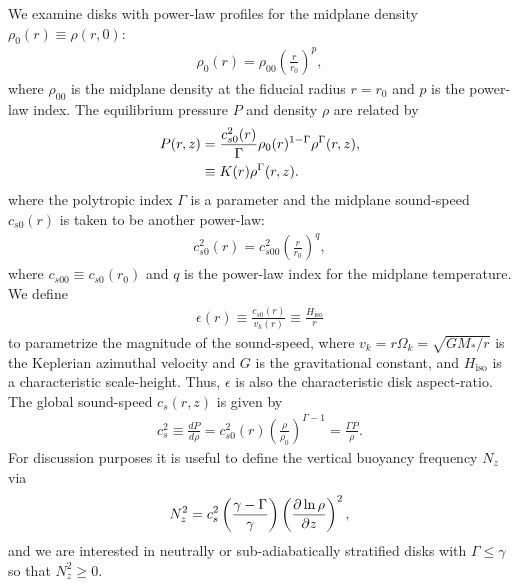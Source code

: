 We examine disks with power-law profiles for the midplane density
$\rho_0(r)\equiv\rho(r,0)$: 
\begin{align}
  \rho_0(r) = \rho_{00}\left(\frac{r}{r_0}\right)^p,
\end{align}
where $\rho_{00}$ is the midplane density at the fiducial radius
$r=r_0$ and $p$ is the power-law index. The equilibrium pressure $P$
and density $\rho$ are related by 
\begin{align}
  P(r,z) &= 
  \frac{c_{s0}^2(r)}{\Gamma}\rho_0(r)^{1-\Gamma}\rho^\Gamma(r,z),\notag\\
  & \equiv K(r)\rho^{\Gamma}(r,z). \label{eqm_press}
\end{align}
where the polytropic index $\Gamma$ is a parameter and 
the midplane sound-speed $c_{s0}(r)$ is taken to be another power-law: 
\begin{align}
  c_{s0}^2(r)=c_{s00}^2\left(\frac{r}{r_0}\right)^q, 
\end{align}
where $c_{s00}\equiv c_{s0}(r_0)$  and $q$ is the power-law index for
the midplane temperature. We define
\begin{align}
  \epsilon(r) \equiv \frac{c_{s0}(r)}{v_k(r)} \equiv
  \frac{H_\mathrm{iso}}{r} 
\end{align}
to parametrize the magnitude of the sound-speed, where
$v_k=r\Omega_k=\sqrt{GM_*/r}$ is the Keplerian azimuthal velocity and
$G$ is the gravitational constant, and $H_\mathrm{iso}$ is a
characteristic scale-height.  Thus, $\epsilon$ is also the
characteristic disk aspect-ratio.  
The global sound-speed $c_s(r,z)$ is given by
\begin{align}
  c_s^2\equiv \frac{dP}{d\rho} =
  c_{s0}^2(r)\left(\frac{\rho}{\rho_0}\right)^{\Gamma-1} = \frac{\Gamma P}{\rho}. 
\end{align}
For discussion purposes it is useful to define the vertical buoyancy frequency $N_z$ via
\begin{align}
  N_z^2 = c_s^2 \left(\frac{\gamma -
      \Gamma}{\gamma}\right)\left(\frac{\partial\ln\rho}{\partial z}\right)^2,   
\end{align}
and we are interested in neutrally or sub-adiabatically stratified
disks with $\Gamma\leq \gamma$ so that $N_z^2\geq0$.  

